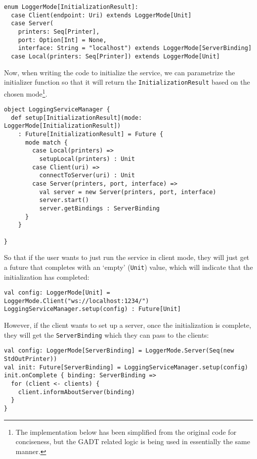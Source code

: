 \begin{lstlisting}[style=scala]
enum LoggerMode[InitializationResult]:
  case Client(endpoint: Uri) extends LoggerMode[Unit]
  case Server(
    printers: Seq[Printer], 
    port: Option[Int] = None, 
    interface: String = "localhost") extends LoggerMode[ServerBinding]
  case Local(printers: Seq[Printer]) extends LoggerMode[Unit]
\end{lstlisting}

Now, when writing the code to initialize the service, we can parametrize the initializer function so that it will return the \texttt{InitializationResult} based on the chosen mode\footnote{The implementation below has been simplified from the original code for conciseness, but the GADT related logic is being used in essentially the same manner.}.

\begin{lstlisting}[style=scala]
object LoggingServiceManager {
  def setup[InitializationResult](mode: LoggerMode[InitializationResult])
    : Future[InitializationResult] = Future {
      mode match {
        case Local(printers) =>
          setupLocal(printers) : Unit
        case Client(uri) =>
          connectToServer(uri) : Unit
        case Server(printers, port, interface) =>
          val server = new Server(printers, port, interface)
          server.start()
          server.getBindings : ServerBinding
      }
    }
    
}
\end{lstlisting}

So that if the user wants to just run the service in client mode, they will just get a future that completes with an `empty' (\texttt{Unit}) value, which will indicate that the initialization has completed:

\begin{lstlisting}[style=scala]
val config: LoggerMode[Unit] = LoggerMode.Client("ws://localhost:1234/")
LoggingServiceManager.setup(config) : Future[Unit]
\end{lstlisting}

However, if the client wants to set up a server, once the initialization is complete, they will get the \texttt{ServerBinding} which they can pass to the clients:

\begin{lstlisting}[style=scala]
val config: LoggerMode[ServerBinding] = LoggerMode.Server(Seq(new StdOutPrinter))
val init: Future[ServerBinding] = LoggingServiceManager.setup(config)
init.onComplete { binding: ServerBinding =>
  for (client <- clients) {
    client.informAboutServer(binding)
  }
}
\end{lstlisting}

